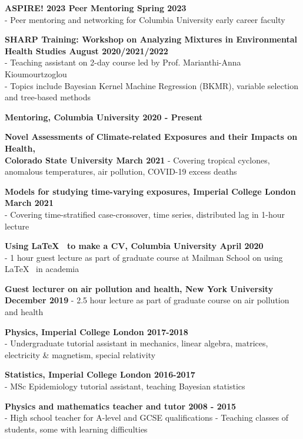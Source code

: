 \noindent \textbf{ASPIRE! 2023 Peer Mentoring \hfill Spring 2023}\\
\noindent - Peer mentoring and networking for Columbia University early career faculty
\bigskip

\noindent \textbf{SHARP Training: Workshop on Analyzing Mixtures in Environmental Health Studies \hfill August 2020/2021/2022}\\
\noindent - Teaching assistant on 2-day course led by Prof. Marianthi-Anna Kioumourtzoglou\\
\noindent - Topics include Bayesian Kernel Machine Regression (BKMR), variable selection and tree-based methods \bigskip

\noindent \textbf{Mentoring, Columbia University \hfill 2020 - Present}
\bigskip

\noindent \textbf{Novel Assessments of Climate-related Exposures and their Impacts on Health, \\Colorado State University \hfill March 2021}
\noindent - Covering tropical cyclones, anomalous temperatures, air pollution, COVID-19 excess deaths 
\bigskip

\noindent \textbf{Models for studying time-varying exposures, Imperial College London \hfill March 2021}\\
\noindent - Covering time-stratified case-crossover, time series, distributed lag in 1-hour lecture
\bigskip

\noindent \textbf{Using \LaTeX ~ to make a CV, Columbia University \hfill April 2020}\\
\noindent - 1 hour guest lecture as part of graduate course at Mailman School on using \LaTeX ~ in academia \bigskip

\noindent \textbf{Guest lecturer on air pollution and health, New York University \hfill December 2019}
\noindent - 2.5 hour lecture as part of graduate course on air pollution and health 
\bigskip

\noindent \textbf{Physics, Imperial College London \hfill 2017-2018}\\
\noindent - Undergraduate tutorial assistant in mechanics, linear algebra, matrices, electricity \& magnetism, special relativity
\bigskip

\noindent \textbf{Statistics, Imperial College London \hfill 2016-2017}\\
- MSc Epidemiology tutorial assistant, teaching Bayesian statistics
\bigskip

\noindent \textbf{Physics and mathematics teacher and tutor \hfill 2008 - 2015}\\
- High school teacher for A-level and GCSE qualifications
- Teaching classes of students, some with learning difficulties	

